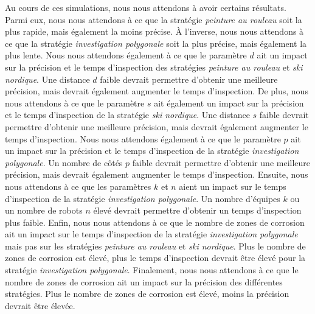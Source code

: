 \documentclass[francais,RandD]{rapportPFE}
\begin{document}
		Au cours de ces simulations, nous nous attendons à avoir certains résultats.
		Parmi eux, nous nous attendons à ce que la stratégie \textit{peinture au rouleau} soit la plus rapide, mais également la moins précise.
		À l'inverse, nous nous attendons à ce que la stratégie \textit{investigation polygonale} soit la plus précise, mais également la plus lente.
		Nous nous attendons également à ce que le paramètre $d$ ait un impact sur la précision et le temps d'inspection des stratégies \textit{peinture au rouleau} et \textit{ski nordique}.
		Une distance $d$ faible devrait permettre d'obtenir une meilleure précision, mais devrait également augmenter le temps d'inspection.
		De plus, nous nous attendons à ce que le paramètre $s$ ait également un impact sur la précision et le temps d'inspection de la stratégie \textit{ski nordique}.
		Une distance $s$ faible devrait permettre d'obtenir une meilleure précision, mais devrait également augmenter le temps d'inspection.
		Nous nous attendons également à ce que le paramètre $p$ ait un impact sur la précision et le temps d'inspection de la stratégie \textit{investigation polygonale}.
		Un nombre de côtés $p$ faible devrait permettre d'obtenir une meilleure précision, mais devrait également augmenter le temps d'inspection.
		Ensuite, nous nous attendons à ce que les paramètres $k$ et $n$ aient un impact sur le temps d'inspection de la stratégie \textit{investigation polygonale}.
		Un nombre d'équipes $k$ ou un nombre de robots $n$ élevé devrait permettre d'obtenir un temps d'inspection plus faible.
		Enfin, nous nous attendons à ce que le nombre de zones de corrosion ait un impact sur le temps d'inspection de la stratégie \textit{investigation polygonale} mais pas sur les stratégies \textit{peinture au rouleau} et \textit{ski nordique}.
		Plus le nombre de zones de corrosion est élevé, plus le temps d'inspection devrait être élevé pour la stratégie \textit{investigation polygonale}.
		Finalement, nous nous attendons à ce que le nombre de zones de corrosion ait un impact sur la précision des différentes stratégies.
		Plus le nombre de zones de corrosion est élevé, moins la précision devrait être élevée.
\end{document}
